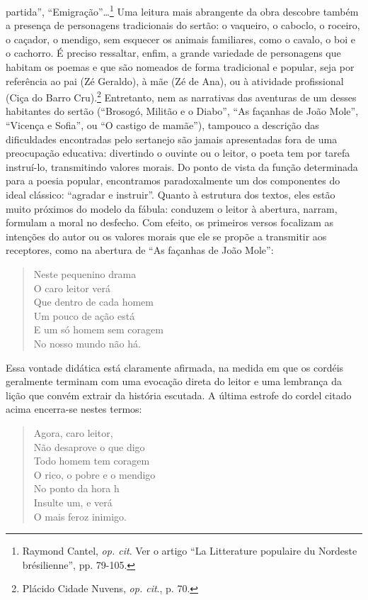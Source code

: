 partida”, “Emigração”\ldots{}\footnote{ Raymond Cantel, \textit{op. cit}. Ver o artigo
“La Litterature populaire du Nordeste brésilienne”, pp. 79-105.} Uma
leitura mais abrangente da obra descobre também a presença de personagens
tradicionais do sertão: o vaqueiro, o caboclo, o roceiro, o caçador, o mendigo,
sem esquecer os animais familiares, como o cavalo, o boi e o cachorro. É preciso
ressaltar, enfim, a grande variedade de personagens que habitam os poemas e que
são nomeados de forma tradicional e popular, seja por referência ao pai (Zé
Geraldo), à mãe (Zé de Ana), ou à atividade profissional (Ciça do Barro
Cru).\footnote{ Plácido Cidade Nuvens, \textit{op. cit}., p. 70.} Entretanto,
nem as narrativas das aventuras de um desses habitantes do sertão (“Brosogó,
Militão e o Diabo”, “As façanhas de João Mole”, “Vicença e Sofia”, ou “O castigo
de mamãe”), tampouco a descrição das dificuldades encontradas pelo sertanejo são
jamais apresentadas fora de uma preocupação educativa: divertindo o ouvinte ou o
leitor, o poeta tem por tarefa instruí-lo, transmitindo valores morais. Do ponto
de vista da função determinada para a poesia popular, encontramos paradoxalmente
um dos componentes do ideal clássico: “agradar e instruir”. Quanto à estrutura
dos textos, eles estão muito próximos do modelo da fábula: conduzem o leitor à
abertura, narram, formulam a moral no desfecho. Com efeito, os primeiros versos
focalizam as intenções do autor ou os valores morais que ele se propõe a
transmitir aos receptores, como na abertura de “As façanhas de João Mole”:

\begin{verse}
Neste pequenino drama\\
O caro leitor verá\\
Que dentro de cada homem\\
Um pouco de ação está\\
E um só homem sem coragem\\
No nosso mundo não há.
\end{verse}

Essa vontade didática está claramente afirmada, na medida em que os cordéis
geralmente terminam com uma evocação direta do leitor e uma lembrança da lição
que convém extrair da história escutada. A última estrofe do cordel citado
acima encerra-se nestes termos:

\begin{verse}
Agora, caro leitor,\\
Não desaprove o que digo\\
Todo homem tem coragem\\
O rico, o pobre e o mendigo\\
No ponto da hora h\\
Insulte um, e verá\\
O mais feroz inimigo.
\end{verse}


